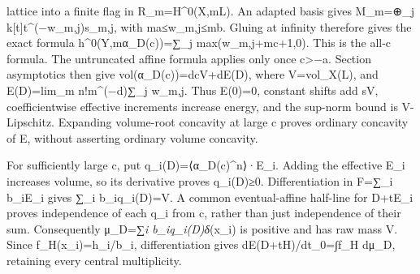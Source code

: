 \documentclass[
  10pt,
]{article}
\begin{document}
\begin{enumerate}
  lattice into a finite flag in R\_m=H\^{}0(X,mL). An adapted basis
  gives M\_m=⊕\_j k{[}t{]}t\^{}(−w\_m,j)s\_m,j, with ma≤w\_m,j≤mb.
  Gluing at infinity therefore gives the exact formula
  h\^{}0(Y,mα\_D(c))=∑\_j max(w\_m,j+mc+1,0). This is the all-c formula.
  The untruncated affine formula applies only once c\textgreater−a.
  Section asymptotics then give vol(α\_D(c))=dcV+dE(D), where
  V=vol\_X(L), and E(D)=lim\_m n!m\^{}(−d)∑\_j w\_m,j. Thus E(0)=0,
  constant shifts add sV, coefficientwise effective increments increase
  energy, and the sup-norm bound is V-Lipschitz. Expanding volume-root
  concavity at large c proves ordinary concavity of E, without asserting
  ordinary volume concavity.
\end{enumerate}

For sufficiently large c, put q\_i(D)=⟨α\_D(c)\^{}n⟩·E\_i. Adding the
effective E\_i increases volume, so its derivative proves q\_i(D)≥0.
Differentiation in F=∑\_i b\_iE\_i gives ∑\_i b\_iq\_i(D)=V. A common
eventual-affine half-line for D+tE\_i proves independence of each q\_i
from c, rather than just independence of their sum. Consequently
μ\_D=∑\emph{i b\_iq\_i(D)δ}(x\_i) is positive and has raw mass V. Since
f\_H(x\_i)=h\_i/b\_i, differentiation gives dE(D+tH)/dt\textbar\_0=∫f\_H
dμ\_D, retaining every central multiplicity.
\end{document}
